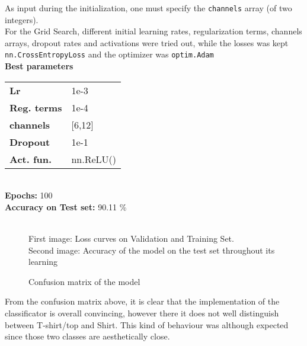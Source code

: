 \documentclass[11pt,a4paper,twocolumn]{IEEEtran}
\newcommand{\thinsepline}{\noindent\makebox[\linewidth]{\rule{7.5cm}{0.02pt}}}
\newcommand{\thinnersepline}{\noindent\makebox[\linewidth]{\rule{7.5cm}{0.01pt}}}
\begin{document}
			As input during the initialization, one must specify the \texttt{channels} array (of two integers).\medskip\\
			For the Grid Search, different initial learning rates, regularization terms, channels arrays, dropout rates and activations were tried out, while the losses was kept \texttt{nn.CrossEntropyLoss} and the optimizer was \texttt{optim.Adam}
			\thinsepline\\
			\textbf{Best parameters}\medskip\\
			\begin{tabular}{ll}
				\textbf{Lr}	& 1e-3 \\
				\textbf{Reg. terms}	& 1e-4 \\
				\textbf{channels} & [6,12] \\
				\textbf{Dropout} & 1e-1 \\
				\textbf{Act. fun.} & nn.ReLU() \\
			\end{tabular}
			\thinnersepline\\
			\textbf{Epochs:} 100\\
			\textbf{Accuracy on Test set:} 90.11 \%\vspace*{-.2cm}\\
			\thinsepline\vspace*{-.7cm}\\
			\newpage
			\begin{figure}[h]
				\centering
				
				\caption{First image: Loss curves on Validation and Training Set.\\ Second image: Accuracy of the model on the test set throughout its learning}
			\end{figure}
			\begin{figure}[h]
				\centering
				
				\caption{Confusion matrix of the model}
			\end{figure}
			From the confusion matrix above, it is clear that the implementation of the classificator is overall convincing, however there it does not well distinguish between T-shirt/top and Shirt. This kind of behaviour was although expected since those two classes are aesthetically close.
\end{document}
